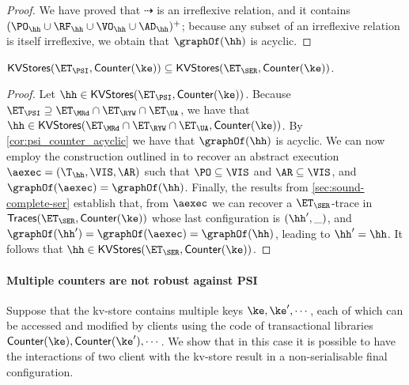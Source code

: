 \begin{proof}
We have proved that $\dashrightarrow$ is an irreflexive relation, and it contains $(\PO_{\hh} \cup \RF_{\hh} \cup \VO_{\hh} \cup \AD_{\hh})^+$; 
because any subset of an irreflexive relation is itself irreflexive, we obtain that $\graphOf(\hh)$ is acyclic.
\end{proof}

\begin{corollary}
$\mathsf{KVStores}(\ET_{\PSI}, \mathsf{Counter}(\ke)) \subseteq \mathsf{KVStores}(\ET_{\SER}, \mathsf{Counter}(\ke))$. 
\end{corollary}

\begin{proof}
Let $\hh \in \mathsf{KVStores}(\ET_{\PSI}, \mathsf{Counter}(\ke))$. Because $\ET_{\PSI} \supseteq \ET_{\MRd} \cap \ET_{\RYW} \cap \ET_{\UA}$, 
we have that $\hh \in \mathsf{KVStores}(\ET_{\MRd} \cap \ET_{\RYW} \cap \ET_{\UA}, \mathsf{Counter}(\ke))$. 
By \cref{cor:psi_counter_acyclic} we have that $\graphOf(\hh)$ is acyclic. We can now employ the construction 
outlined in \cite{laws} to recover an abstract execution $\aexec = (\T_{\hh}, \VIS, \AR)$ such that $\PO \subseteq \VIS$ and $\AR \subseteq \VIS$, 
and $\graphOf(\aexec) = \graphOf(\hh)$.
Finally, the results from \cref{sec:sound-complete-ser} establish that, from $\aexec$ we can recover a $\ET_{\SER}$-trace in 
$\mathsf{Traces}(\ET_{\SER}, \mathsf{Counter}(\ke))$ 
whose last configuration is $(\hh', \_)$, and 
$\graphOf(\hh') = \graphOf(\aexec) = \graphOf(\hh)$, leading to $\hh' = \hh$. It follows that $\hh \in 
\mathsf{KVStores}(\ET_{\SER}, \mathsf{Counter}(\ke))$.
\end{proof}

\paragraph{Multiple counters are not robust against PSI}
Suppose that the kv-store contains multiple keys $\ke, \ke', \cdots$, each of which 
can be accessed and modified by clients using the code of transactional libraries 
$\mathsf{Counter}(\ke), \mathsf{Counter}(\ke'), \cdots$. We show that in this
 case it is possible to have the interactions of two client with the kv-store result 
 in  a non-serialisable final configuration. 
 

